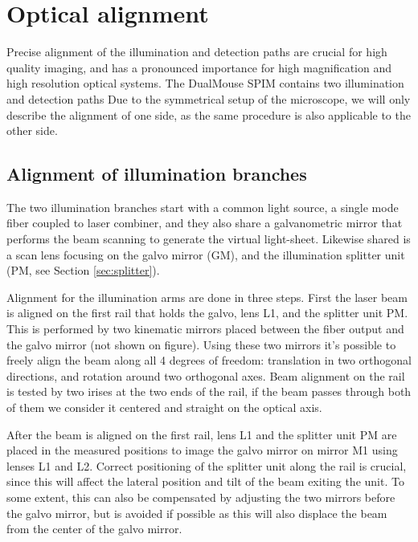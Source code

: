       


\section{Optical alignment}
  Precise alignment of the illumination and detection paths are crucial for high quality imaging, and has a pronounced  importance for high magnification and high resolution optical systems. The DualMouse SPIM contains two illumination and detection paths 
  Due to the symmetrical setup of the microscope, we will only describe the alignment of one side, as the same procedure is also applicable to the other side.

  \subsection{Alignment of illumination branches}

    The two illumination branches start with a common light source, a single mode fiber coupled to laser combiner, and they also share a galvanometric mirror that performs the beam scanning to generate the virtual light-sheet. Likewise shared is a scan lens focusing on the galvo mirror (GM), and the illumination splitter unit (PM, see Section \ref{sec:splitter}).

    Alignment for the illumination arms are done in three steps. First the laser beam is aligned on the first rail that holds the galvo, lens L1, and the splitter unit PM. This is performed by two kinematic mirrors placed between the fiber output and the galvo mirror (not shown on figure). Using these two mirrors it's possible to freely align the beam along all 4 degrees of freedom: translation in two orthogonal directions, and rotation around two orthogonal axes. Beam alignment on the rail is tested by two irises at the two ends of the rail, if the beam passes through both of them we consider it centered and straight on the optical axis.

    After the beam is aligned on the first rail, lens L1 and the splitter unit PM are placed in the measured positions to image the galvo mirror on mirror M1 using lenses L1 and L2. Correct positioning of the splitter unit along the rail is crucial, since this will affect the lateral position and tilt of the beam exiting the unit. To some extent, this can also be compensated by adjusting the two mirrors before the galvo mirror, but is avoided if possible as this will also displace the beam from the center of the galvo mirror.

